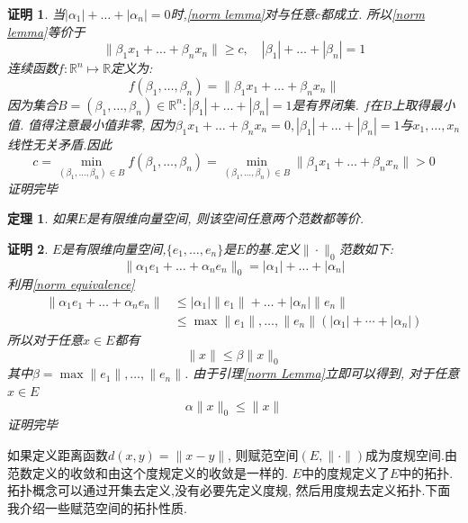 \documentclass[a4paper,11pt]{article}
\theoremstyle{mystyle}
\newtheorem{theorem}{\hspace{2em}定理}[section]
\newtheorem{Proof}{\hspace{2em}证明}[section]
\begin{document}
\begin{Proof}
  当$|\alpha_1|+\dots+|\alpha_n|=0$时,\eqref{norm lemma}对与任意$c$都成立. 所以\eqref{norm lemma}等价于
  \begin{equation*}
    \|\beta_1x_1+\dots+\beta_nx_n\|\geq c,\quad|\beta_1|+\dots+|\beta_n|=1
  \end{equation*}
  连续函数$f:\mathbb{R}^n\mapsto\mathbb{R}$定义为:
  \begin{equation*}
    f(\beta_1,\dots,\beta_n)=\|\beta_1x_1+\dots+\beta_nx_n\|
  \end{equation*}
  因为集合$B={(\beta_1,\dots,\beta_n)\in\mathbb{R}^n:|\beta_1|+\dots+|\beta_n|=1}$是有界闭集. $f$在$B$上取得最小值. 值得注意最小值非零, 因为$\beta_1x_1+\dots+\beta_nx_n=0,|\beta_1|+\dots+|\beta_n|=1$与$x_1,\dots,x_n$线性无关矛盾.因此
  \begin{equation*}
    c=\min_{(\beta_1,\dots,\beta_n)\in B}f(\beta_1,\dots,\beta_n)=\min_{(\beta_1,\dots,\beta_n)\in B}\|\beta_1x_1+\dots+\beta_nx_n\|>0
  \end{equation*}
  证明完毕
\end{Proof}
\begin{theorem}
  如果$E$是有限维向量空间, 则该空间任意两个范数都等价.
\end{theorem}
\begin{Proof}
  $E$是有限维向量空间,$\{e_1,\dots,e_n\}$是$E$的基.定义$\|\cdot\|_0$范数如下:
  \begin{equation*}
    \|\alpha_1e_1+\dots+\alpha_ne_n\|_0=|\alpha_1|+\dots+|\alpha_n|
  \end{equation*}
  利用\ref{norm equivalence}
  \begin{equation*}
  \begin{split}
     \|\alpha_1e_1+\dots+\alpha_ne_n\|&\leq|\alpha_1|\|e_1\|+\dots+|\alpha_n|\|e_n\| \\
       &\leq\max{\|e_1\|,\dots,\|e_n\|}(|\alpha_1|+\cdots+|\alpha_n|)
  \end{split}
  \end{equation*}
  所以对于任意$x\in E$都有
  \begin{equation*}
    \|x\|\leq\beta\|x\|_0
  \end{equation*}
  其中$\beta=\max{\|e_1\|,\dots,\|e_n\|}$. 由于引理\ref{norm Lemma}立即可以得到, 对于任意$x\in E$
  \begin{equation*}
    \alpha\|x\|_0\leq\|x\|
  \end{equation*}
  证明完毕
\end{Proof}
如果定义距离函数$d(x,y)=\|x-y\|$, 则赋范空间$(E,\|\cdot\|)$成为度规空间.由范数定义的收敛和由这个度规定义的收敛是一样的. $E$中的度规定义了$E$中的拓扑. 拓扑概念可以通过开集去定义,没有必要先定义度规, 然后用度规去定义拓扑.下面我介绍一些赋范空间的拓扑性质.
\end{document}
